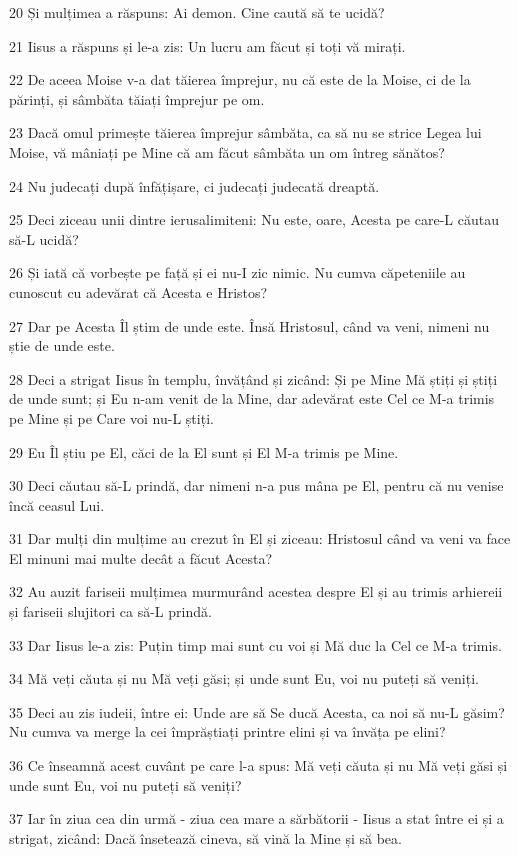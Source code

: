 \par 20 Și mulțimea a răspuns: Ai demon. Cine caută să te ucidă?
\par 21 Iisus a răspuns și le-a zis: Un lucru am făcut și toți vă mirați.
\par 22 De aceea Moise v-a dat tăierea împrejur, nu că este de la Moise, ci de la părinți, și sâmbăta tăiați împrejur pe om.
\par 23 Dacă omul primește tăierea împrejur sâmbăta, ca să nu se strice Legea lui Moise, vă mâniați pe Mine că am făcut sâmbăta un om întreg sănătos?
\par 24 Nu judecați după înfățișare, ci judecați judecată dreaptă.
\par 25 Deci ziceau unii dintre ierusalimiteni: Nu este, oare, Acesta pe care-L căutau să-L ucidă?
\par 26 Și iată că vorbește pe față și ei nu-I zic nimic. Nu cumva căpeteniile au cunoscut cu adevărat că Acesta e Hristos?
\par 27 Dar pe Acesta Îl știm de unde este. Însă Hristosul, când va veni, nimeni nu știe de unde este.
\par 28 Deci a strigat Iisus în templu, învățând și zicând: Și pe Mine Mă știți și știți de unde sunt; și Eu n-am venit de la Mine, dar adevărat este Cel ce M-a trimis pe Mine și pe Care voi nu-L știți.
\par 29 Eu Îl știu pe El, căci de la El sunt și El M-a trimis pe Mine.
\par 30 Deci căutau să-L prindă, dar nimeni n-a pus mâna pe El, pentru că nu venise încă ceasul Lui.
\par 31 Dar mulți din mulțime au crezut în El și ziceau: Hristosul când va veni va face El minuni mai multe decât a făcut Acesta?
\par 32 Au auzit fariseii mulțimea murmurând acestea despre El și au trimis arhiereii și fariseii slujitori ca să-L prindă.
\par 33 Dar Iisus le-a zis: Puțin timp mai sunt cu voi și Mă duc la Cel ce M-a trimis.
\par 34 Mă veți căuta și nu Mă veți găsi; și unde sunt Eu, voi nu puteți să veniți.
\par 35 Deci au zis iudeii, între ei: Unde are să Se ducă Acesta, ca noi să nu-L găsim? Nu cumva va merge la cei împrăștiați printre elini și va învăța pe elini?
\par 36 Ce înseamnă acest cuvânt pe care l-a spus: Mă veți căuta și nu Mă veți găsi și unde sunt Eu, voi nu puteți să veniți?
\par 37 Iar în ziua cea din urmă - ziua cea mare a sărbătorii - Iisus a stat între ei și a strigat, zicând: Dacă însetează cineva, să vină la Mine și să bea.
